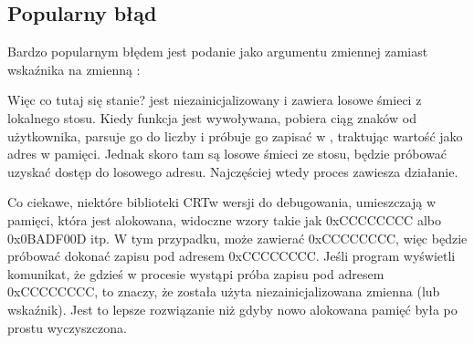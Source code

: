\subsection{Popularny błąd}

Bardzo popularnym błędem jest podanie jako argumentu zmiennej  zamiast wskaźnika na zmienną :



Więc co tutaj się stanie?
 jest niezainicjalizowany i zawiera losowe śmieci z lokalnego stosu.
Kiedy funkcja \scanf jest wywoływana, pobiera ciąg znaków od użytkownika, parsuje go do liczby i próbuje go zapisać w , traktując wartość  jako adres w pamięci.
Jednak skoro tam są losowe śmieci ze stosu, \scanf będzie próbować uzyskać dostęp do losowego adresu.
Najczęściej wtedy proces zawiesza działanie.

Co ciekawe, niektóre biblioteki \ac{CRT}w wersji do debugowania, umieszczają w pamięci, która jest alokowana, widoczne wzory takie jak  0xCCCCCCCC albo 0x0BADF00D itp.
W tym przypadku,  może zawierać 0xCCCCCCCC, więc \scanf będzie próbować dokonać zapisu pod adresem 0xCCCCCCCC.
Jeśli program wyświetli komunikat, że gdzieś w procesie wystąpi próba zapisu pod adresem 0xCCCCCCCC, to znaczy, że
została użyta niezainicjalizowana zmienna (lub wskaźnik).
Jest to lepsze rozwiązanie niż gdyby nowo alokowana pamięć była po prostu wyczyszczona.
